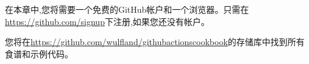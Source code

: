 在本章中,您将需要一个免费的GitHub帐户和一个浏览器。只需在\url{https://github.com/signup}下注册,如果您还没有帐户。

您将在\url{https://github.com/wulfland/githubactionscookbook}的存储库中找到所有食谱和示例代码。